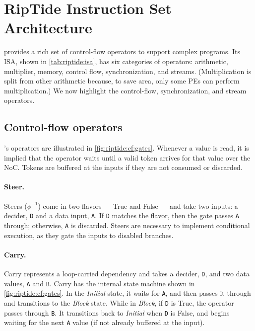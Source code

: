 \section{RipTide Instruction Set Architecture}
\label{riptide:cf}



\riptide provides a rich set of control-flow operators to support complex programs.
% 
Its ISA, shown in \autoref{tab:riptide:isa}, has six categories of operators: arithmetic, multiplier, memory, control flow, synchronization, and streams.
%
(Multiplication is split from other arithmetic because, to save area, only some PEs can perform multiplication.)
%
We now highlight the control-flow, synchronization, and stream operators.

\subsection{Control-flow operators}
%
\riptide's operators are illustrated in \autoref{fig:riptide:cf:gates}.
%
Whenever a value is read, it is implied that the
operator waits until a valid token arrives for that value over the
NoC. Tokens are buffered at the inputs if they are not
consumed or discarded.

\figRipTideISA
\figRipTideCFGates

\figRipTideCompiler

\paragraph{Steer.} 
Steers ($\phi^{-1}$) come in two flavors --- True and False --- and take two inputs: a decider, {\tt D} and a data input, {\tt A}.
% 
If {\tt D} matches the flavor, then the gate passes {\tt A} through; otherwise, {\tt A} is discarded.
% 
Steers are necessary to implement conditional execution, as they gate the inputs to disabled branches.

\paragraph{Carry.}
\label{cf:carry}
% 
Carry represents a loop-carried dependency and takes a decider, {\tt D}, and two data values, {\tt A} and {\tt B}.
% 
Carry has the internal state machine shown in \autoref{fig:riptide:cf:gates}.
%
In the {\em Initial} state, it waits for {\tt A}, and then passes it through and transitions to the {\em Block} state.
%
While in {\em Block}, if {\tt D} is True, the operator passes through {\tt B}.
%
It transitions back to {\em Initial} when {\tt D} is False, and begins waiting for the next {\tt A} value (if not already buffered at the input).

